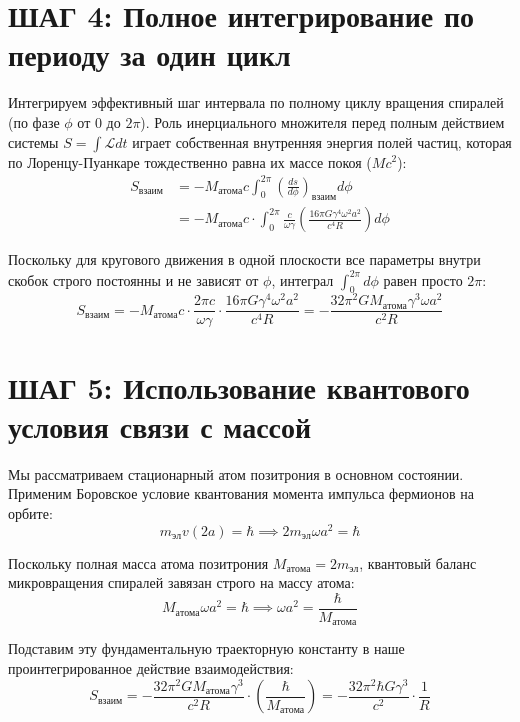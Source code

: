 \documentclass[12pt,a4paper]{article}
\begin{document}
\section*{ШАГ 4: Полное интегрирование по периоду за один цикл}

Интегрируем эффективный шаг интервала по полному циклу вращения спиралей (по фазе $\phi$ от $0$ до $2\pi$). Роль инерциального множителя перед полным действием системы $S = \int \mathcal{L} dt$ играет собственная внутренняя энергия полей частиц, которая по Лоренцу-Пуанкаре тождественно равна их массе покоя ($M c^2$):
\begin{align}
S_{взаим} &= - M_{атома} c \int_0^{2\pi} \left( \frac{ds}{d\phi} \right)_{взаим} d\phi \\
&= - M_{атома} c \cdot \int_0^{2\pi} \frac{c}{\omega \gamma} \left( \frac{16\pi G \gamma^4 \omega^2 a^2}{c^4 R} \right) d\phi
\end{align}

Поскольку для кругового движения в одной плоскости все параметры внутри скобок строго постоянны и не зависят от $\phi$, интеграл $\int_0^{2\pi} d\phi$ равен просто $2\pi$:
\begin{equation}
S_{взаим} = - M_{атома} c \cdot \frac{2\pi c}{\omega \gamma} \cdot \frac{16\pi G \gamma^4 \omega^2 a^2}{c^4 R} = - \frac{32 \pi^2 G M_{атома} \gamma^3 \omega a^2}{c^2 R}
\end{equation}

\section*{ШАГ 5: Использование квантового условия связи с массой}

Мы рассматриваем стационарный атом позитрония в основном состоянии. Применим Боровское условие квантования момента импульса фермионов на орбите:
\begin{equation}
m_{эл} v (2a) = \hbar \implies 2 m_{эл} \omega a^2 = \hbar
\end{equation}

Поскольку полная масса атома позитрония $M_{атома} = 2 m_{эл}$, квантовый баланс микровращения спиралей завязан строго на массу атома:
\begin{equation}
M_{атома} \omega a^2 = \hbar \implies \omega a^2 = \frac{\hbar}{M_{атома}}
\end{equation}

Подставим эту фундаментальную траекторную константу в наше проинтегрированное действие взаимодействия:
\begin{equation}
S_{взаим} = - \frac{32 \pi^2 G M_{атома} \gamma^3}{c^2 R} \cdot \left( \frac{\hbar}{M_{атома}} \right) = - \frac{32 \pi^2 \hbar G \gamma^3}{c^2} \cdot \frac{1}{R}
\end{equation}
\end{document}
